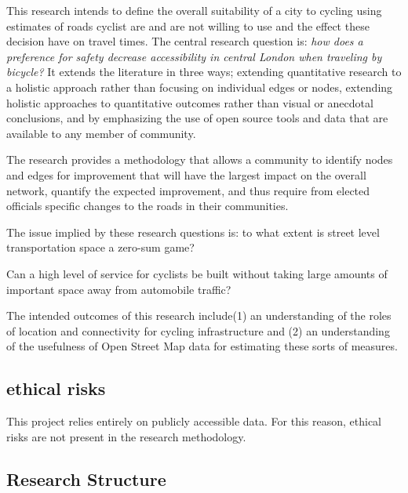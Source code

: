 This research intends to define the overall suitability of a city to cycling using estimates of roads cyclist are and are not willing to use and the effect these decision have on travel times. The central research question is: \textit{how does a preference for safety decrease accessibility in central London when traveling by bicycle?} It extends the literature in three ways; extending quantitative research to a holistic approach rather than focusing on individual edges or nodes, extending holistic approaches to quantitative outcomes rather than visual or anecdotal conclusions, and by emphasizing the use of open source tools and data that are available to any member of community. 

The research provides a methodology that allows a community to identify nodes and edges for improvement that will have the largest impact on the overall network, quantify the expected improvement, and thus require from elected officials specific changes to the roads in their communities.  

The issue implied by these research questions is: to what extent is street level transportation space a zero-sum game? 

Can a high level of service for cyclists be built without taking large amounts of important space away from automobile traffic? 

The intended outcomes of this research include(1) an understanding of the roles of location and connectivity for cycling infrastructure and (2) an understanding of the usefulness of Open Street Map data for estimating these sorts of measures. 

\subsection{ethical risks}

This project relies entirely on publicly accessible data. For this reason, ethical risks are not present in the research methodology.  

\subsection{Research Structure}

